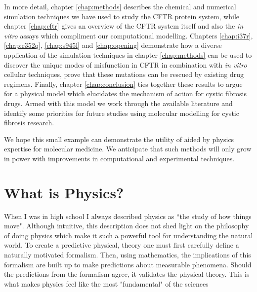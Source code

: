 In more detail, chapter \ref{chap:methods} describes the chemical and numerical simulation techniques we have used to study the CFTR protein system, while chapter \ref{chap:cftr} gives an overview of the CFTR system itself and also the \textit {in vitro} assays which compliment our computational modelling.  Chapters \ref{chap:i37r}, \ref{chap:r352q}, \ref{chap:s945l} and \ref{chap:opening} demonstrate how a diverse application of the simulation techniques in chapter \ref{chap:methods} can be used to discover the unique modes of misfunction in CFTR in combination with \textit {in vitro} cellular techniques, prove that these mutations can be rescued by existing drug regimens. Finally, chapter \ref{chap:conclusion} ties together these results to argue for a physical model which elucidates the mechanism of action for cystic fibrosis drugs. Armed with this model we work through the available literature and identify some priorities for future studies using molecular modelling for cystic fibrosis research.

We hope this small example can demonstrate the utility of aided by physics expertise for molecular medicine. We anticipate that such methods will only grow in power with improvements in computational and experimental techniques.

\section{What is Physics?}
When I was in high school I always described physics as ``the study of how things move". Although intuitive, this description does not shed light on the philosophy of doing physics which make it such a powerful tool for understanding the natural world. To create a predictive physical, theory one must first carefully define a naturally motivated formalism. Then, using mathematics, the implications of this formalism are built up to make predictions about measurable phenomena. Should the predictions from the formalism agree, it validates the physical theory. This is what makes physics feel like the most "fundamental" of the sciences


